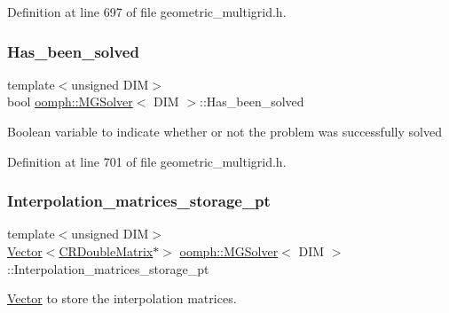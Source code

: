 Definition at line 697 of file geometric\+\_\+multigrid.\+h.

\mbox{\label{classoomph_1_1MGSolver_af7b6c7e1c4e047f8c5a7c83e5b8169c7}} 
\subsubsection{\texorpdfstring{Has\+\_\+been\+\_\+solved}{Has\_been\_solved}}
{\footnotesize\ttfamily template$<$unsigned D\+IM$>$ \\
bool \hyperlink{classoomph_1_1MGSolver}{oomph\+::\+M\+G\+Solver}$<$ D\+IM $>$\+::Has\+\_\+been\+\_\+solved\hspace{0.3cm}{\ttfamily [private]}}

Boolean variable to indicate whether or not the problem was successfully solved 

Definition at line 701 of file geometric\+\_\+multigrid.\+h.

\mbox{\label{classoomph_1_1MGSolver_abb0744bdd778ed6076ee60803b0bc24a}} 
\subsubsection{\texorpdfstring{Interpolation\+\_\+matrices\+\_\+storage\+\_\+pt}{Interpolation\_matrices\_storage\_pt}}
{\footnotesize\ttfamily template$<$unsigned D\+IM$>$ \\
\hyperlink{classoomph_1_1Vector}{Vector}$<$\hyperlink{classoomph_1_1CRDoubleMatrix}{C\+R\+Double\+Matrix}$\ast$$>$ \hyperlink{classoomph_1_1MGSolver}{oomph\+::\+M\+G\+Solver}$<$ D\+IM $>$\+::Interpolation\+\_\+matrices\+\_\+storage\+\_\+pt\hspace{0.3cm}{\ttfamily [private]}}



\hyperlink{classoomph_1_1Vector}{Vector} to store the interpolation matrices. 




